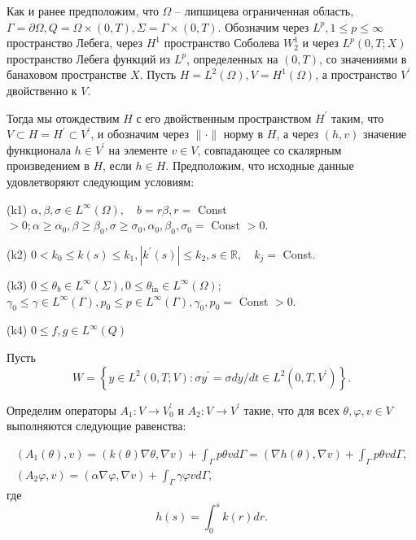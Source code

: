 Как и ранее предположим, что $\Omega$ -- липшицева ограниченная область,
$\Gamma=\partial \Omega, Q=\Omega \times(0, T), \Sigma=\Gamma \times(0, T)$.
Обозначим через $L^{p}, 1 \leq p \leq \infty$ пространство Лебега,
через $H^{1}$ пространство Соболева $W_{2}^{1}$ и через $L^{p}(0, T ; X)$
пространство Лебега функций из $L^{p}$, определенных на $(0, T)$,
со значениями в банаховом пространстве $X$.
Пусть $H=L^{2}(\Omega), V=H^{1}(\Omega)$,
а пространство $V^{\prime}$ двойственно к $V$.

Тогда мы отождествим $H$ с его двойственным пространством $H^{\prime}$
таким, что $V \subset H=H^{\prime} \subset V^{\prime}$,
и обозначим через $\|\cdot\|$ норму в $H$, а через $(h, v)$ значение
функционала $h \in V^{\prime}$ на элементе $v \in V$, совпадающее
со скалярным произведением в $H$, если $h \in H$.
Предположим, что исходные данные удовлетворяют следующим условиям:

(k1) $\alpha, \beta, \sigma \in L^{\infty}(\Omega),
\quad b=r \beta, r=$ Const $>0 ; \alpha \geq \alpha_{0}, \beta \geq \beta_{0},
\sigma \geq \sigma_{0}, \alpha_{0}, \beta_{0}, \sigma_{0}=$ Const $>0$.

(k2) $0<k_{0} \leq k(s) \leq k_{1},\left|k^{\prime}(s)\right| \leq k_{2},
s \in \mathbb{R}, \quad k_{j}=$ Const.

(k3) $0 \leq \theta_{b} \in L^{\infty}(\Sigma), 0 \leq \theta_{\text{in}}
\in L^{\infty}(\Omega)$; $\gamma_{0} \leq \gamma \in L^{\infty}(\Gamma), p_{0}
\leq p \in L^{\infty}(\Gamma), \gamma_{0}, p_{0}=$ Const $>0$.

(k4) $0 \leq f, g \in L^{\infty}(Q)$

Пусть
\[
    W=\left\{y \in L^{2}(0, T ; V): \sigma y^{\prime}=\sigma d y / d t \in L^{2}
    \left(0, T, V^{\prime}\right)\right\}.
\]


Определим операторы $A_{1}: V \rightarrow V_{0}^{\prime}$ и $A_{2}: V \rightarrow V^{\prime}$
такие, что для всех $\theta, \varphi, v \in V$ выполняются следующие равенства:

\[
    \begin{gathered}
        \left(A_{1}(\theta), v\right)=(k(\theta) \nabla \theta, \nabla v)
        +\int_{\Gamma} p \theta v d \Gamma=(\nabla h(\theta), \nabla v)
        +\int_{\Gamma} p \theta v d \Gamma, \\
        \left(A_{2} \varphi, v\right)=(\alpha \nabla \varphi, \nabla v)
        +\int_{\Gamma} \gamma \varphi v d \Gamma,
    \end{gathered}
\]
где
\[
    h(s)=\int_{0}^{s} k(r) d r.
\]

